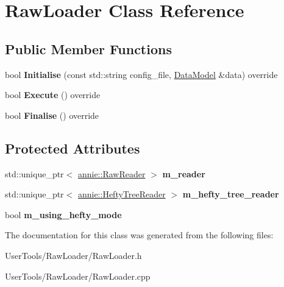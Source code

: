 \hypertarget{classRawLoader}{
\section{RawLoader Class Reference}
\label{classRawLoader}
}
\subsection*{Public Member Functions}
\begin{DoxyCompactItemize}
\item 
\hypertarget{classRawLoader_ae1c05cc78031706983688968c8301980}{
bool {\bfseries Initialise} (const std::string config\_\-file, \hyperlink{classDataModel}{DataModel} \&data) override}
\label{classRawLoader_ae1c05cc78031706983688968c8301980}

\item 
\hypertarget{classRawLoader_a1b6104569dab1b8e48487eda0f3b3cb4}{
bool {\bfseries Execute} () override}
\label{classRawLoader_a1b6104569dab1b8e48487eda0f3b3cb4}

\item 
\hypertarget{classRawLoader_a2f7c4abad1a0b59b6cbd4f28ec31a1ec}{
bool {\bfseries Finalise} () override}
\label{classRawLoader_a2f7c4abad1a0b59b6cbd4f28ec31a1ec}

\end{DoxyCompactItemize}
\subsection*{Protected Attributes}
\begin{DoxyCompactItemize}
\item 
\hypertarget{classRawLoader_a71fd51944f2719b8106d5ed9763ae0bc}{
std::unique\_\-ptr$<$ \hyperlink{classannie_1_1RawReader}{annie::RawReader} $>$ {\bfseries m\_\-reader}}
\label{classRawLoader_a71fd51944f2719b8106d5ed9763ae0bc}

\item 
\hypertarget{classRawLoader_a675c51ad0d732caa1d42e60d780edef9}{
std::unique\_\-ptr$<$ \hyperlink{classannie_1_1HeftyTreeReader}{annie::HeftyTreeReader} $>$ {\bfseries m\_\-hefty\_\-tree\_\-reader}}
\label{classRawLoader_a675c51ad0d732caa1d42e60d780edef9}

\item 
\hypertarget{classRawLoader_aa56f600a7138f78d2775f40136783df4}{
bool {\bfseries m\_\-using\_\-hefty\_\-mode}}
\label{classRawLoader_aa56f600a7138f78d2775f40136783df4}

\end{DoxyCompactItemize}


The documentation for this class was generated from the following files:\begin{DoxyCompactItemize}
\item 
UserTools/RawLoader/RawLoader.h\item 
UserTools/RawLoader/RawLoader.cpp\end{DoxyCompactItemize}
